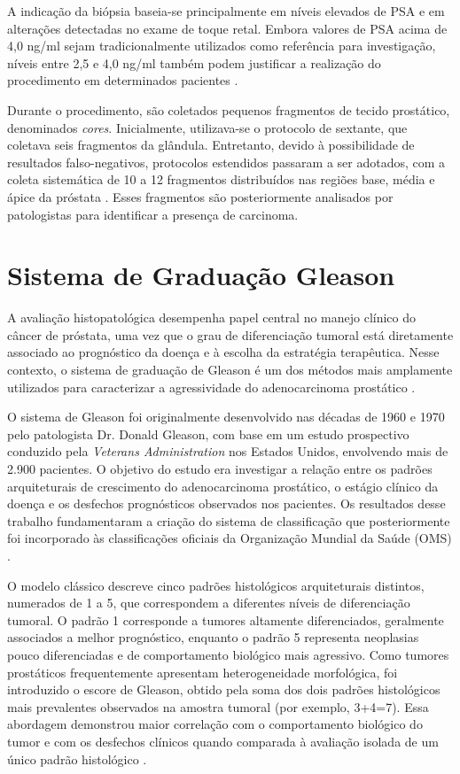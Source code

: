 A indicação da biópsia baseia-se principalmente em níveis elevados de PSA e em alterações detectadas no exame de toque retal. Embora valores de PSA acima de 4,0 ng/ml sejam tradicionalmente utilizados como referência para investigação, níveis entre 2,5 e 4,0 ng/ml também podem justificar a realização do procedimento em determinados pacientes \cite{matlaga2003prostate}.

Durante o procedimento, são coletados pequenos fragmentos de tecido prostático, denominados \textit{cores}. Inicialmente, utilizava-se o protocolo de sextante, que coletava seis fragmentos da glândula. Entretanto, devido à possibilidade de resultados falso-negativos, protocolos estendidos passaram a ser adotados, com a coleta sistemática de 10 a 12 fragmentos distribuídos nas regiões base, média e ápice da próstata \cite{matlaga2003prostate}. Esses fragmentos são posteriormente analisados por patologistas para identificar a presença de carcinoma.


\section{Sistema de Graduação Gleason}
A avaliação histopatológica desempenha papel central no manejo clínico do câncer de próstata, uma vez que o grau de diferenciação tumoral está diretamente associado ao prognóstico da doença e à escolha da estratégia terapêutica. Nesse contexto, o sistema de graduação de Gleason é um dos métodos mais amplamente utilizados para caracterizar a agressividade do adenocarcinoma prostático \cite{ref-epstein2016}.

O sistema de Gleason foi originalmente desenvolvido nas décadas de 1960 e 1970 pelo patologista Dr. Donald Gleason, com base em um estudo prospectivo conduzido pela \textit{Veterans Administration} nos Estados Unidos, envolvendo mais de 2.900 pacientes. O objetivo do estudo era investigar a relação entre os padrões arquiteturais de crescimento do adenocarcinoma prostático, o estágio clínico da doença e os desfechos prognósticos observados nos pacientes. Os resultados desse trabalho fundamentaram a criação do sistema de classificação que posteriormente foi incorporado às classificações oficiais da Organização Mundial da Saúde (OMS) \cite{chen2016}.

O modelo clássico descreve cinco padrões histológicos arquiteturais distintos, numerados de 1 a 5, que correspondem a diferentes níveis de diferenciação tumoral. O padrão 1 corresponde a tumores altamente diferenciados, geralmente associados a melhor prognóstico, enquanto o padrão 5 representa neoplasias pouco diferenciadas e de comportamento biológico mais agressivo. Como tumores prostáticos frequentemente apresentam heterogeneidade morfológica, foi introduzido o escore de Gleason, obtido pela soma dos dois padrões histológicos mais prevalentes observados na amostra tumoral (por exemplo, 3+4=7). Essa abordagem demonstrou maior correlação com o comportamento biológico do tumor e com os desfechos clínicos quando comparada à avaliação isolada de um único padrão histológico \cite{chen2016}.

